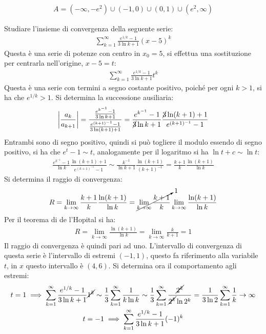 \documentclass{article}
\numberwithin{equation}{subsection}
\begin{document}

\begin{gather*}
    A=(-\infty, -e^2)\cup(-1,0)\cup(0,1)\cup(e^2,\infty)
\end{gather*}


Studiare l'insieme di convergenza della seguente serie:
\begin{gather*}
    \displaystyle\sum_{k=1}^\infty\frac{e^{1/k}-1}{3\ln k+1}(x-5)^k
\end{gather*}
Questa è una serie di potenze con centro in $x_0=5$, si effettua una sostituzione per centrarla nell'origine, $x-5=t$:
\begin{gather*}
    \displaystyle\sum_{k=1}^\infty\frac{e^{1/k}-1}{3\ln k+1}t^k
\end{gather*}
Questa è una serie con termini a segno costante positivo, poiché per ogni $k>1$, si ha che $e^{1/k}>1$. Si determina la successione ausiliaria:
\begin{gather*}
    \displaystyle\left|\frac{a_k}{a_{k+1}}\right|=
    \frac{\frac{e^{k^{-1}}-1}{3\ln k+1}}{\frac{e^{(k+1)^{-1}}-1}{3\ln(k+1)+1}}=\frac{e^{k^{-1}}-1}{\cancel{3}\ln k+1}\frac{\cancel{3}\ln(k+1)+1}{e^{(k+1)^{-1}}-1}
\end{gather*}
Entrambi sono di segno positivo, quindi si può togliere il modulo essendo di segno positivo, si ha che $e^{t}-1\sim t$, analogamente per il logaritmo si ha $\ln t+c\sim\ln t$:
\begin{gather*}
    \frac{e^{k^{-1}}-1}{\ln k}\frac{\ln(k+1)+1}{e^{(k+1)^{-1}}-1}\sim\frac{k^{-1}}{\ln k+1}\frac{\ln(k+1)}{(k+1)^{-1}}=\frac{k+1}{k}\frac{\ln(k+1)}{\ln k}
\end{gather*}
Si determina il raggio di convergenza:
\begin{gather*}
    R=\lim_{k\to\infty}\frac{k+1}{k}\frac{\ln(k+1)}{\ln k}=\cancelto{1}{\lim_{k\to\infty}\frac{k+1}{k}}\lim_{k\to\infty}\frac{\ln(k+1)}{\ln k}
\end{gather*}
Per il teorema di de l'Hopital si ha:
\begin{gather*}
    R=\lim_{k\to\infty}\frac{\ln(k+1)}{\ln k}=\lim_{k\to\infty}\frac{k}{k+1}=1
\end{gather*}
Il raggio di convergenza è quindi pari ad uno. L'intervallo di convergenza di questa serie è l'intervallo di estremi $(-1, 1)$, questo fa riferimento alla variabile $t$, in $x$ questo intervallo è $(4,6)$. Si determina ora il comportamento agli estremi:
\begin{gather*}
    t=1\implies
    \displaystyle\sum_{k=1}^\infty\frac{e^{1/k}-1}{3\ln k+1}\cancel{1^k}\sim
    \displaystyle\frac{1}{3}\sum_{k=1}^\infty\frac{1}{k\ln k}\sim\frac{1}{3}\sum_{k=1}^\infty\frac{\cancel{2^k}}{\cancel{2^k}\ln2^k}=\frac{1}{3\ln2}\sum_{k=1}^\infty\frac{1}{k}\to\infty
    \\
    t=-1\implies
    \displaystyle\sum_{k=1}^\infty\frac{e^{1/k}-1}{3\ln k+1}(-1)^k
\end{gather*}
\end{document}
